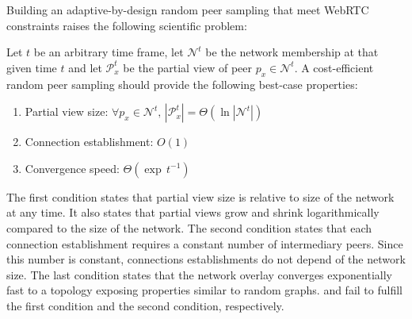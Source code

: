 Building an adaptive-by-design random peer sampling that meet WebRTC
constraints raises the following scientific problem:

\begin{problem}
  Let $t$ be an arbitrary time frame, let $\mathcal{N}^t$ be the
  network membership at that given time $t$ and let $\mathcal{P}_x^t$
  be the partial view of peer $p_x \in \mathcal{N}^t$.  A
  cost-efficient random peer sampling should provide the following
  best-case properties:
  \begin{enumerate}
  \item  \begin{center}
    Partial view size: \hfill
    $\forall p_x \in \mathcal{N}^t,\, |\mathcal{P}_x^t| = \Theta (\ln
    |\mathcal{N}^t|)$
  \end{center}
  
\item \begin{center}
    Connection establishment: \hfill $O(1)$
  \end{center}
 
\item  \begin{center}
    Convergence speed: \hfill $\Theta(\exp \, t^{-1})$
  \end{center}
  \end{enumerate}
\end{problem}

The first condition states that partial view size is relative to size of the
network at any time. It also states that partial views grow and shrink
logarithmically compared to the size of the network. The second condition
states that each connection establishment requires a constant number of
intermediary peers. Since this number is constant, connections establishments
do not depend of the network size. The last condition states that the network
overlay converges exponentially fast to a topology exposing properties similar
to random graphs.  \CYCLON and \SCAMP fail to fulfill the first condition
and the second condition, respectively.

